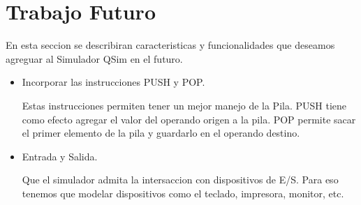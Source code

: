 \section{Trabajo Futuro}

En esta seccion se describiran caracteristicas y funcionalidades que deseamos agreguar al Simulador QSim en el futuro.

\begin{itemize}

\item Incorporar las instrucciones PUSH y POP.

Estas instrucciones permiten tener un mejor manejo de la Pila. 
PUSH tiene como efecto agregar el valor del operando origen a la pila. 
POP permite sacar el primer elemento de la pila y guardarlo en el operando destino.

\item Entrada y Salida.

Que el simulador admita la intersaccion con dispositivos de E/S. Para eso tenemos que modelar dispositivos como el teclado, impresora, monitor, etc.

\end{itemize}

